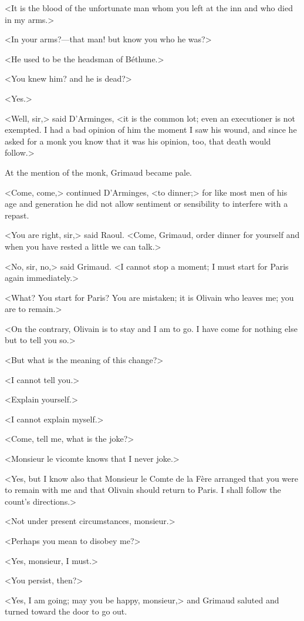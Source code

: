 <It is the blood of the unfortunate man whom you left at the inn and who died in my arms.>

<In your arms?—that man! but know you who he was?>

<He used to be the headsman of Béthune.>

<You knew him? and he is dead?>

<Yes.>

<Well, sir,> said D'Arminges, <it is the common lot; even an executioner is not exempted. I had a bad opinion of him the moment I saw his wound, and since he asked for a monk you know that it was his opinion, too, that death would follow.>

At the mention of the monk, Grimaud became pale.

<Come, come,> continued D'Arminges, <to dinner;> for like most men of his age and generation he did not allow sentiment or sensibility to interfere with a repast.

<You are right, sir,> said Raoul. <Come, Grimaud, order dinner for yourself and when you have rested a little we can talk.>

<No, sir, no,> said Grimaud. <I cannot stop a moment; I must start for Paris again immediately.>

<What? You start for Paris? You are mistaken; it is Olivain who leaves me; you are to remain.>

<On the contrary, Olivain is to stay and I am to go. I have come for nothing else but to tell you so.>

<But what is the meaning of this change?>

<I cannot tell you.>

<Explain yourself.>

<I cannot explain myself.>

<Come, tell me, what is the joke?>

<Monsieur le vicomte knows that I never joke.>

<Yes, but I know also that Monsieur le Comte de la Fère arranged that you were to remain with me and that Olivain should return to Paris. I shall follow the count's directions.>

<Not under present circumstances, monsieur.>

<Perhaps you mean to disobey me?>

<Yes, monsieur, I must.>

<You persist, then?>

<Yes, I am going; may you be happy, monsieur,> and Grimaud saluted and turned toward the door to go out.

